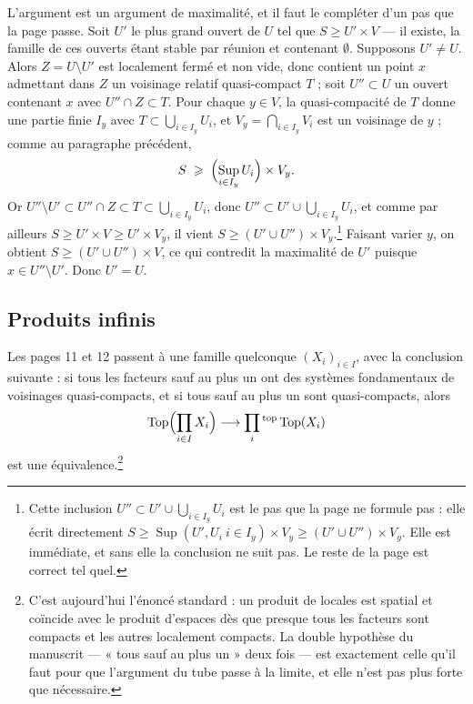 \documentclass[11pt,a4paper]{article}
\begin{document}
L'argument est un argument de maximalité, et il faut le compléter d'un pas que
la page passe. Soit $U'$ le plus grand ouvert de $U$ tel que
$S \geqslant U' \times V$ — il existe, la famille de ces ouverts étant stable
par réunion et contenant $\emptyset$. Supposons $U' \neq U$. Alors
$Z = U \setminus U'$ est localement fermé et non vide, donc contient un point
$x$ admettant dans $Z$ un voisinage relatif quasi-compact $T$ ; soit
$U'' \subset U$ un ouvert contenant $x$ avec $U'' \cap Z \subset T$. Pour
chaque $y \in V$, la quasi-compacité de $T$ donne une partie finie $I_{y}$ avec
$T \subset \bigcup_{i \in I_{y}} U_{i}$, et $V_{y} = \bigcap_{i \in I_{y}} V_{i}$
est un voisinage de $y$ ; comme au paragraphe précédent,
\[
S \;\geqslant\; \Bigl(\operatorname*{Sup}_{i \in I_{y}} U_{i}\Bigr) \times V_{y}.
\]
Or $U'' \setminus U' \subset U'' \cap Z \subset T \subset
\bigcup_{i \in I_{y}} U_{i}$, donc $U'' \subset U' \cup
\bigcup_{i \in I_{y}} U_{i}$, et comme par ailleurs
$S \geqslant U' \times V \geqslant U' \times V_{y}$, il vient
$S \geqslant (U' \cup U'') \times V_{y}$.\footnote{Cette inclusion
$U'' \subset U' \cup \bigcup_{i \in I_{y}} U_{i}$ est le pas que la page ne
formule pas : elle écrit directement
$S \geqslant \operatorname{Sup}(U', U_{i}\ i \in I_{y}) \times V_{y}
\geqslant (U' \cup U'') \times V_{y}$. Elle est immédiate, et sans elle la
conclusion ne suit pas. Le reste de la page est correct tel quel.} Faisant
varier $y$, on obtient $S \geqslant (U' \cup U'') \times V$, ce qui contredit
la maximalité de $U'$ puisque $x \in U'' \setminus U'$. Donc $U' = U$.

\subsection*{Produits infinis}

Les pages 11 et 12 passent à une famille quelconque $(X_{i})_{i \in I}$, avec
la conclusion suivante : si tous les facteurs sauf au plus un ont des systèmes
fondamentaux de voisinages quasi-compacts, et si tous sauf au plus un sont
quasi-compacts, alors
\[
\operatorname{Top}\Bigl(\prod_{i \in I} X_{i}\Bigr) \longrightarrow
\prod_{i}{}^{\mathrm{top}} \operatorname{Top}(X_{i})
\]
est une équivalence.\footnote{C'est aujourd'hui l'énoncé standard : un produit
de locales est spatial et coïncide avec le produit d'espaces dès que presque
tous les facteurs sont compacts et les autres localement compacts. La double
hypothèse du manuscrit — « tous sauf au plus un » deux fois — est exactement
celle qu'il faut pour que l'argument du tube passe à la limite, et elle n'est
pas plus forte que nécessaire.}
\end{document}
